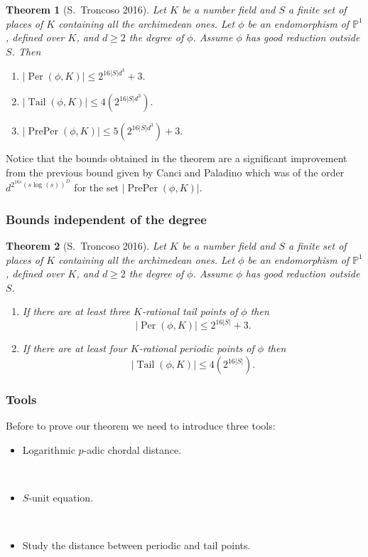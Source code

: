 \documentclass{beamer}
\def\jump{ \quad \\ \vspace{0.7cm} \pause}
\def\PP{{\mathbb P}}
\DeclareMathOperator{\Tail}{Tail}
\DeclareMathOperator{\Per}{Per}
\DeclareMathOperator{\PrePer}{PrePer}
\theoremstyle{thmstyle}
\theoremstyle{thmstyle}
\newtheorem*{mythm}{Theorem}
\theoremstyle{mystyle}
\theoremstyle{qstnstyle}
\begin{document}
\begin{frame}
\begin{mythm}[S.\ Troncoso 2016]
Let $K$ be a number field and $S$ a finite set of places of $K$ containing all the archimedean ones. Let $\phi $ be an endomorphism of $\PP^1$, defined over $K$, and $d \geq 2$ the degree of $\phi$. Assume $\phi$ has  good reduction outside $S$. Then
\begin{enumerate}
\item [(a)] $|\Per(\phi,K)| \leq  2^{16|S|d^3}+3.$

\item [(b)] $|\Tail(\phi,K)| \leq  4(2^{16|S|d^3}) .$

\item [(c)] $|\PrePer(\phi,K)| \leq 5(2^{16|S|d^3})+3.$

\end{enumerate}
\end{mythm}

Notice that the bounds obtained  in the theorem are a significant improvement from the previous bound given by Canci and Paladino which was of the order $\displaystyle d^{2^{16s}\left( s\log(s) \right)^{D}}$ for the set $|\PrePer(\phi,K)|$.

\end{frame}

\begin{frame}
\frametitle{Bounds independent of the degree}
\begin{mythm}[S.\ Troncoso 2016]
Let $K$ be a number field and $S$ a finite set of places of $K$ containing all the archimedean ones. Let $\phi $ be an endomorphism of $\PP^1$, defined over $K$, and $d \geq 2$ the degree of $\phi$. Assume $\phi$ has  good reduction outside $S$.
\begin{enumerate}

\item [(a)] 
If there are at least three $K$-rational tail points of $\phi$ then
$$|\Per(\phi,K)| \leq 2^{16|S|}+3. $$

\item [(b)]
If there are at least four $K$-rational periodic points of $\phi$ then
$$|\Tail(\phi,K)| \leq 4(2^{16|S|}).$$
\end{enumerate}
\end{mythm}
\end{frame}


\begin{frame}
\frametitle{Tools}
Before to prove our theorem we need to introduce three tools:\jump
\begin{itemize}
\item Logarithmic $p$-adic chordal distance.

\jump

\item $S$-unit equation.

\jump

\item Study the distance between periodic and tail points.
\end{itemize}

\end{frame}
\end{document}
